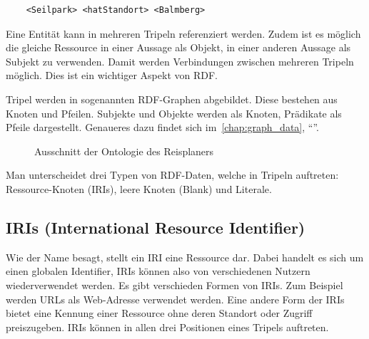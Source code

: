 \begin{lstlisting}
    <Seilpark> <hatStandort> <Balmberg>
\end{lstlisting}

Eine Entität kann in mehreren Tripeln referenziert werden. Zudem ist es möglich die gleiche Ressource in einer Aussage als Objekt, in einer anderen Aussage als Subjekt zu verwenden. Damit werden Verbindungen zwischen mehreren Tripeln möglich. Dies ist ein wichtiger Aspekt von RDF.\@

Tripel werden in sogenannten RDF-Graphen abgebildet. Diese bestehen aus Knoten und Pfeilen. Subjekte und Objekte werden als Knoten, Prädikate als Pfeile dargestellt. Genaueres dazu findet sich im~\autoref{chap:graph_data}, ``''.

\begin{figure}[H]
\centering {}
\caption{Ausschnitt der Ontologie des Reisplaners\label{fig:rdf_reiseplaner_ontologie}\protect\footnotemark}
\end{figure}

Man unterscheidet drei Typen von RDF-Daten, welche in Tripeln auftreten: Ressource-Knoten (IRIs), leere Knoten (Blank) und Literale.

\subsection{IRIs (International Resource Identifier)}
\label{sec:rdf_rdf_dataModel_iris}
Wie der Name besagt, stellt ein IRI eine Ressource dar. Dabei handelt es sich um einen globalen Identifier, IRIs können also von verschiedenen Nutzern wiederverwendet werden. Es gibt verschieden Formen von IRIs. Zum Beispiel werden URLs als Web-Adresse verwendet werden. Eine andere Form der IRIs bietet eine Kennung einer Ressource ohne deren Standort oder Zugriff preiszugeben. IRIs können in allen drei Positionen eines Tripels auftreten.

